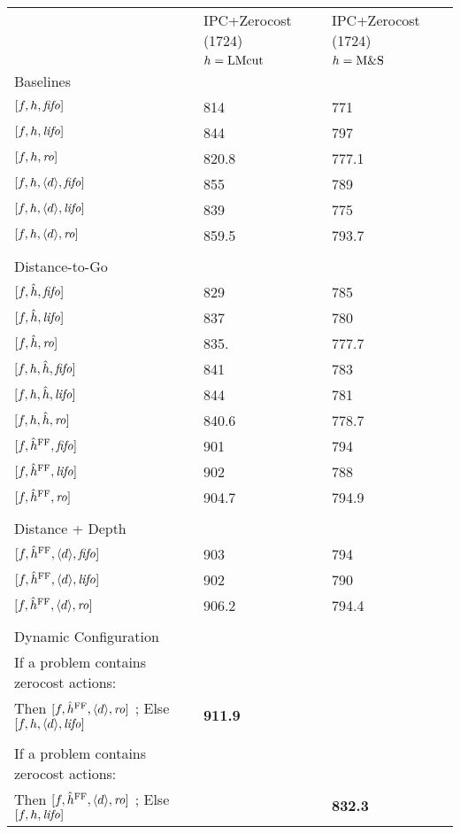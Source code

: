 \begin{center}
\begin{tabular}{|l|l|l|}
\hline
 & IPC+Zerocost (1724) & IPC+Zerocost (1724)\\
 & \(h=\lmcut\) & \(h=\mands\)\\
\hline
Baselines &  & \\
\([f,h,\fifo]\) & 814 & 771\\
\([f,h,\lifo]\) & 844 & 797\\
\([f,h,\ro]\) & 820.8 & 777.1\\
\([f,h,\depth,\fifo]\) & 855 & 789\\
\([f,h,\depth,\lifo]\) & 839 & 775\\
\([f,h,\depth,\ro]\) & 859.5 & 793.7\\
 &  & \\
Distance-to-Go &  & \\
\([f,\hh,\fifo]\) & 829 & 785\\
\([f,\hh,\lifo]\) & 837 & 780\\
\([f,\hh,\ro]\) & 835. & 777.7\\
\([f,h,\hh,\fifo]\) & 841 & 783\\
\([f,h,\hh,\lifo]\) & 844 & 781\\
\([f,h,\hh,\ro]\) & 840.6 & 778.7\\
\([f,\ffo,\fifo]\) & 901 & 794\\
\([f,\ffo,\lifo]\) & 902 & 788\\
\([f,\ffo,\ro]\) & 904.7 & 794.9\\
 &  & \\
Distance + Depth &  & \\
\([f,\ffo,\depth,\fifo]\) & 903 & 794\\
\([f,\ffo,\depth,\lifo]\) & 902 & 790\\
\([f,\ffo,\depth,\ro]\) & 906.2 & 794.4\\
 &  & \\
Dynamic Configuration &  & \\
If a problem contains zerocost actions: &  & \\
Then \([f,\ffo,\depth,\ro]\) ; Else \([f,h,\depth,\lifo]\) & \textbf{911.9} & \\
 &  & \\
If a problem contains zerocost actions: &  & \\
Then \([f,\ffo,\depth,\ro]\) ; Else \([f,h,\lifo]\) &  & \textbf{832.3}\\
\hline
\end{tabular}
\end{center}
